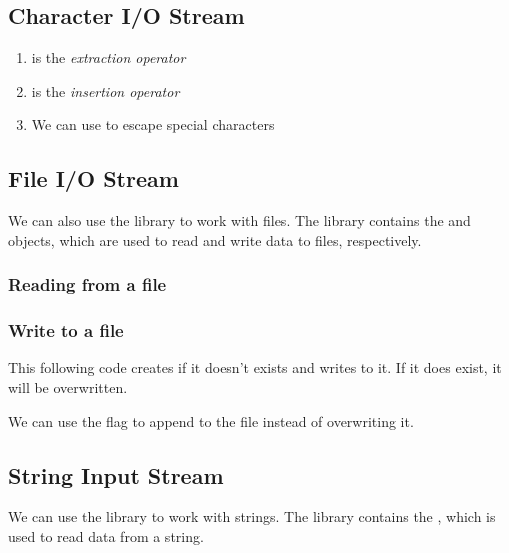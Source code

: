 \documentclass{article}
\begin{document}
\subsection{Character I/O Stream}

\begin{enumerate}
    \item {} is the \emph{extraction operator}
    \item {} is the \emph{insertion operator}
    \item We can use  to escape special characters
\end{enumerate}

\subsection{File I/O Stream}
We can also use the  library to work with files. The  library contains the  and  objects, which are used to read and write data to files, respectively.

\subsubsection{Reading from a file}


\subsubsection{Write to a file}
This following code creates  if it doesn't exists and writes to it. If it does exist, it will be overwritten.


We can use the  flag to append to the file instead of overwriting it.


\subsection{String Input Stream}
We can use the  library to work with strings. The  library contains the , which is used to read data from a string.
\end{document}
